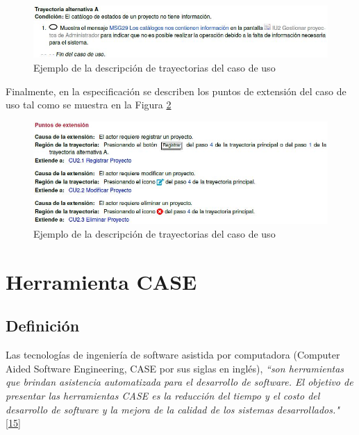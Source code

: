 \begin{figure}[H]
	\begin{center}
		\includegraphics[width=1\textwidth]{images/marcoteorico/alternativa}
		\caption{Ejemplo de la descripción de trayectorias del caso de uso}
		\label{fig:trayectoriap}
	\end{center}
\end{figure}

Finalmente, en la especificación se describen los puntos de extensión del caso de uso tal como se muestra en la Figura \ref{fig:puntos}

\begin{figure}[H]
	\begin{center}
		\includegraphics[width=1\textwidth]{images/marcoteorico/puntosdeextension}
		\caption{Ejemplo de la descripción de trayectorias del caso de uso}
		\label{fig:puntos}
	\end{center}
\end{figure}


\section{Herramienta CASE}

\subsection{Definición}

Las tecnologías de ingeniería de software asistida por computadora (Computer Aided Software Engineering, CASE por sus siglas en inglés), \textit {``son herramientas que brindan asistencia automatizada para el desarrollo de software. El objetivo de presentar las herramientas CASE es la reducción del tiempo y el costo del desarrollo de software y la mejora de la calidad de los sistemas desarrollados."} \hyperlink{b15}{[15]}\\


